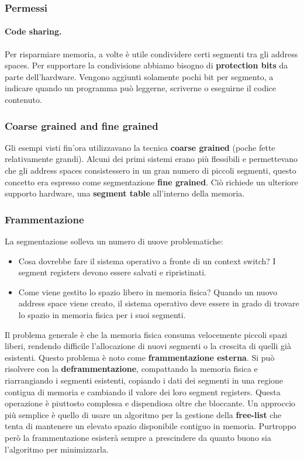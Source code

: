 \documentclass[12pt, letterpaper]{article}
\begin{document}
			\subsubsection{Permessi}
				\paragraph{Code sharing. }Per risparmiare memoria, a volte è  utile condividere certi segmenti tra gli address spaces. Per supportare la condivisione abbiamo bisogno di \textbf{protection bits} da parte dell'hardware. Vengono aggiunti solamente pochi bit per segmento, a indicare quando un programma può leggerne, scriverne o eseguirne il codice contenuto. 
				
			\subsubsection{Coarse grained and fine grained}
				Gli esempi visti fin'ora utilizzavano la tecnica \textbf{coarse grained} (poche fette relativamente grandi). Alcuni dei primi sistemi erano più flessibili e permettevano che gli address spaces consistessero in un gran numero di piccoli segmenti, questo concetto era espresso come segmentazione \textbf{fine grained}. Ciò richiede un ulteriore supporto hardware, una \textbf{segment table} all'interno della memoria.
				
			\subsubsection{Frammentazione} 
				La segmentazione solleva un numero di nuove problematiche:
				\begin{itemize}
					\item Cosa dovrebbe fare il sistema operativo a fronte di un context switch? I segment registers devono essere salvati e ripristinati. 
					\item Come viene gestito lo spazio libero in memoria fisica? Quando un nuovo address space viene creato, il sistema operativo deve essere in grado di trovare lo spazio in memoria fisica per i suoi segmenti. 	
				\end{itemize}				 
				Il problema generale è che la memoria fisica consuma velocemente piccoli spazi liberi, rendendo difficile l'allocazione di nuovi segmenti o la crescita di quelli già esistenti. Questo problema è noto come \textbf{frammentazione esterna}. Si può risolvere con la \textbf{deframmentazione}, compattando la memoria fisica e riarrangiando i segmenti esistenti, copiando i dati dei segmenti in una regione contigua di memoria e cambiando il valore dei loro segment registers. Questa operazione è piuttosto complessa e dispendiosa oltre che bloccante. Un approccio più semplice è quello di usare un algoritmo per la gestione della \textbf{free-list} che tenta di mantenere un elevato spazio disponibile contiguo in memoria. Purtroppo però la frammentazione esisterà sempre a prescindere da quanto buono sia l'algoritmo per minimizzarla.
				
\end{document}
